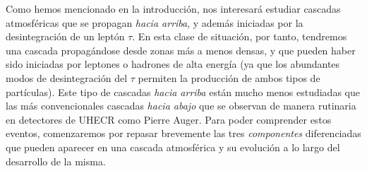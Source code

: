 \documentclass[11 pt, a4paper]{article} %
\numberwithin{equation}{section}
\numberwithin{figure}{section}
\numberwithin{table}{section}
\begin{document}
Como hemos mencionado en la introducción, nos interesará estudiar cascadas atmosféricas que se propagan \textit{hacia arriba}, y además iniciadas por la desintegración de un leptón $\tau$. En esta clase de situación, por tanto, tendremos una cascada propagándose desde zonas más a menos densas, y que pueden haber sido iniciadas por leptones o hadrones de alta energía (ya que los abundantes modos de desintegración del $\tau$ permiten la producción de ambos tipos de partículas). Este tipo de cascadas \textit{hacia arriba} están mucho menos estudiadas que las más convencionales cascadas \textit{hacia abajo} que se observan de manera rutinaria en detectores de UHECR como Pierre Auger. Para poder comprender estos eventos, comenzaremos por repasar brevemente las tres \textit{componentes} diferenciadas que pueden aparecer en una cascada atmosférica y su evolución a lo largo del desarrollo de la misma.
\end{document}
